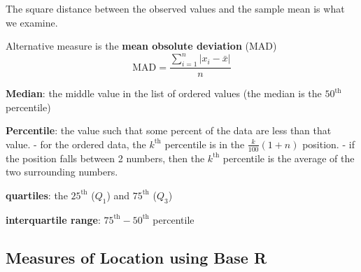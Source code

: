 \documentclass[12pt,]{article}
\begin{document}
The square distance between the observed values and the sample mean is
what we examine.

Alternative measure is the \textbf{mean obsolute deviation} (MAD)
\[\text{MAD} = \frac{\sum^n_{i=1}|x_i-\bar{x}|}{n}\]

\textbf{Median}: the middle value in the list of ordered values (the
median is the \(50^\text{th}\) percentile)

\textbf{Percentile}: the value such that some percent of the data are
less than that value. - for the ordered data, the \(k^\text{th}\)
percentile is in the \(\frac{k}{100}(1+n)\) position. - if the position
falls between 2 numbers, then the \(k^\text{th}\) percentile is the
average of the two surrounding numbers.

\textbf{quartiles}: the \(25^\text{th}\) (\(Q_1\)) and \(75^\text{th}\)
(\(Q_3\))

\textbf{interquartile range}: \(75^\text{th}-50^\text{th}\) percentile

\hypertarget{measures-of-location-using-base-r}{%
\subsection{Measures of Location using Base
R}\label{measures-of-location-using-base-r}}
\end{document}
